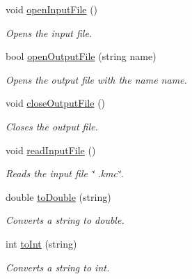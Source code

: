 \begin{DoxyCompactItemize}
\mbox{\label{classIO_aa21a66163d1da9fe02c019c1d20ba3a0}} 
void \mbox{\hyperlink{classIO_aa21a66163d1da9fe02c019c1d20ba3a0}{open\+Input\+File}} ()
\begin{DoxyCompactList}\small\item\em Opens the input file. \end{DoxyCompactList}\item 
bool \mbox{\hyperlink{classIO_a430eb7b5efc3f8467ffc0b507984e705}{open\+Output\+File}} (string name)
\begin{DoxyCompactList}\small\item\em Opens the output file with the name name. \end{DoxyCompactList}\item 
\mbox{\label{classIO_ac5468cb6c41f3e7b9535bada4b3b3c50}} 
void \mbox{\hyperlink{classIO_ac5468cb6c41f3e7b9535bada4b3b3c50}{close\+Output\+File}} ()
\begin{DoxyCompactList}\small\item\em Closes the output file. \end{DoxyCompactList}\item 
\mbox{\label{classIO_ac9c648884d50b1591a32e973fcadbd8e}} 
void \mbox{\hyperlink{classIO_ac9c648884d50b1591a32e973fcadbd8e}{read\+Input\+File}} ()
\begin{DoxyCompactList}\small\item\em Reads the input file \char`\"{} .\+kmc\char`\"{}. \end{DoxyCompactList}\item 
\mbox{\label{classIO_a1de5e3aed18a83b17f92f70b426e17be}} 
double \mbox{\hyperlink{classIO_a1de5e3aed18a83b17f92f70b426e17be}{to\+Double}} (string)
\begin{DoxyCompactList}\small\item\em Converts a string to double. \end{DoxyCompactList}\item 
\mbox{\label{classIO_a8f9cb0f4f28337227aa55dca489c73ac}} 
int \mbox{\hyperlink{classIO_a8f9cb0f4f28337227aa55dca489c73ac}{to\+Int}} (string)
\begin{DoxyCompactList}\small\item\em Converts a string to int. \end{DoxyCompactList}\item 

\end{DoxyCompactItemize}
